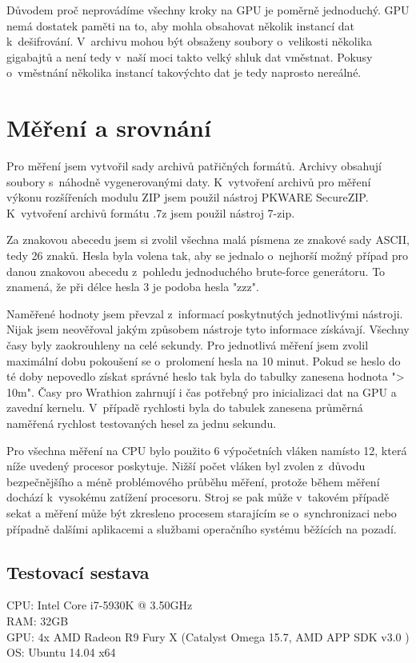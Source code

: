 Důvodem proč neprovádíme všechny kroky na GPU je poměrně jednoduchý. GPU nemá dostatek paměti na
to, aby mohla obsahovat několik instancí dat k~dešifrování. V~archivu mohou být obsaženy soubory
o~velikosti několika gigabajtů a není tedy v~naší moci takto velký shluk dat vměstnat. Pokusy
o~vměstnání několika instancí takovýchto dat je tedy naprosto nereálné. 

\chapter{Měření a srovnání}
\label{ch:mereni_a_srovnani}
Pro měření jsem vytvořil sady archivů patřičných formátů. Archivy obsahují soubory s~náhodně
vygenerovanými daty. K~vytvoření archivů pro měření výkonu rozšířeních modulu ZIP jsem použil
nástroj PKWARE SecureZIP. K~vytvoření archivů formátu .7z jsem použil nástroj 7-zip.

Za znakovou abecedu jsem si zvolil všechna malá písmena ze znakové sady ASCII, tedy 26 znaků.
Hesla byla volena tak, aby se jednalo o~nejhorší možný případ pro danou znakovou abecedu z~pohledu
jednoduchého brute-force generátoru. To znamená, že při délce hesla 3 je podoba hesla "zzz".

Naměřené hodnoty jsem převzal z~informací poskytnutých jednotlivými nástroji. Nijak jsem
neověřoval jakým způsobem nástroje tyto informace získávají. Všechny časy byly zaokrouhleny na
celé sekundy. Pro jednotlivá měření jsem zvolil maximální dobu pokoušení se o~prolomení hesla na
10 minut. Pokud se heslo do té doby nepovedlo získat správné heslo tak byla do tabulky zanesena
hodnota "> 10m". Časy pro Wrathion zahrnují i čas potřebný pro inicializaci dat na GPU a zavední
kernelu. V~případě rychlosti byla do tabulek zanesena průměrná naměřená rychlost testovaných
hesel za jednu sekundu.

Pro všechna měření na CPU bylo použito 6 výpočetních vláken namísto 12, která níže uvedený
procesor poskytuje. Nižší počet vláken byl zvolen z~důvodu bezpečnějšího a méně problémového
průběhu měření, protože během měření dochází k~vysokému zatížení procesoru. Stroj se pak může
v~takovém případě sekat a měření může být zkresleno procesem starajícím se o~synchronizaci nebo
případně dalšími aplikacemi a službami operačního systému běžících na pozadí.

\section{Testovací sestava}
CPU: Intel Core i7-5930K @ 3.50GHz\\
RAM: 32GB\\
GPU: 4x AMD Radeon R9 Fury X (Catalyst Omega 15.7, AMD APP SDK v3.0 )\\
OS: Ubuntu 14.04 x64
